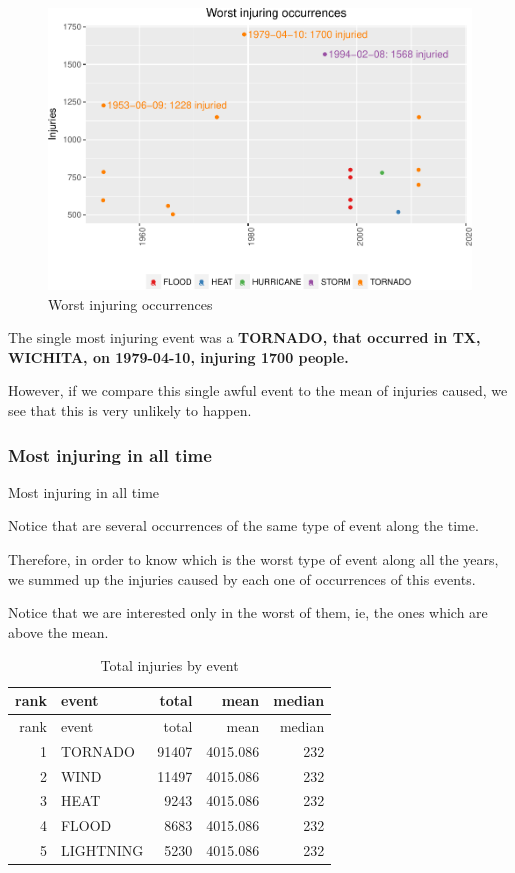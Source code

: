 \documentclass[]{article}
\begin{document}
\begin{figure}[htbp]
\centering
\includegraphics{readme_files/figure-latex/injuring-single-plot-1.pdf}
\caption{Worst injuring occurrences}
\end{figure}

The single most injuring event was a \textbf{TORNADO, that occurred in
TX, WICHITA, on 1979-04-10, injuring 1700 people.}

However, if we compare this single awful event to the mean of injuries
caused, we see that this is very unlikely to happen.

\subsubsection{Most injuring in all
time}\label{most-injuring-in-all-time}

Most injuring in all time

Notice that are several occurrences of the same type of event along the
time.

Therefore, in order to know which is the worst type of event along all
the years, we summed up the injuries caused by each one of occurrences
of this events.

Notice that we are interested only in the worst of them, ie, the ones
which are above the mean.

\begin{longtable}[]{@{}rlrrr@{}}
\caption{Total injuries by event}\tabularnewline
\toprule
rank & event & total & mean & median\tabularnewline
\midrule
\endfirsthead
\toprule
rank & event & total & mean & median\tabularnewline
\midrule
\endhead
1 & TORNADO & 91407 & 4015.086 & 232\tabularnewline
2 & WIND & 11497 & 4015.086 & 232\tabularnewline
3 & HEAT & 9243 & 4015.086 & 232\tabularnewline
4 & FLOOD & 8683 & 4015.086 & 232\tabularnewline
5 & LIGHTNING & 5230 & 4015.086 & 232\tabularnewline
\bottomrule
\end{longtable}
\end{document}
